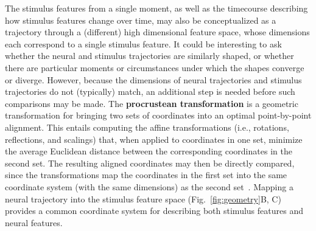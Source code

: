 \documentclass{llmxive}
\begin{document}
The stimulus features from a single moment, as well as the timecourse
describing how stimulus features change over time, may also be
conceptualized as a trajectory through a (different) high dimensional
feature space, whose dimensions each correspond to a single stimulus
feature.  It could be interesting to ask whether the neural and
stimulus trajectories are similarly shaped, or whether there are
particular moments or circumstances under which the shapes converge or
diverge.  However, because the dimensions of neural trajectories and
stimulus trajectories do not (typically) match, an additional step is
needed before such comparisons may be made.  The \textbf{procrustean
  transformation} is a geometric transformation for bringing
two sets of coordinates into an optimal point-by-point alignment.
This entails computing the affine transformations
(i.e., rotations, reflections, and scalings) that, when applied to
coordinates in one set, minimize the average Euclidean distance
between the corresponding coordinates in the second set.  The
resulting aligned coordinates may then be directly compared, since the
transformations map the coordinates in the first set into the same
coordinate system (with the same dimensions) as the second
set~\citep{HaxbEtal11}.  Mapping a neural trajectory into the stimulus
feature space (Fig.~\ref{fig:geometry}B, C) provides a common coordinate
system for describing both stimulus features and neural features.
\end{document}
